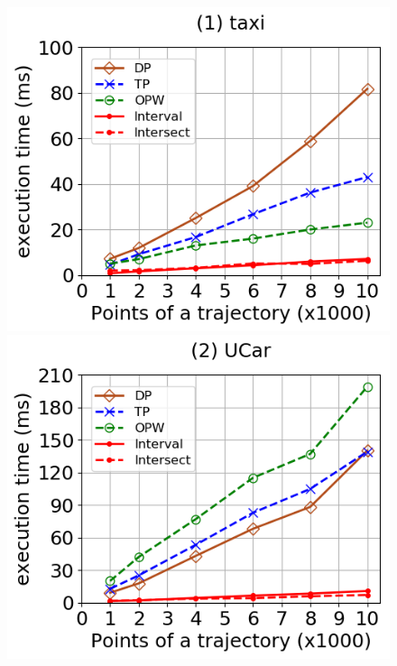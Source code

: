 \begin{figure}[tb!]
	\centering
	\includegraphics[scale=0.315]{Figures/Exp-DAD-time-size-taxi.png}\hspace{1ex}
	\includegraphics[scale=0.315]{Figures/Exp-DAD-time-size-service.png} 	\hspace{1ex}

\end{figure}
